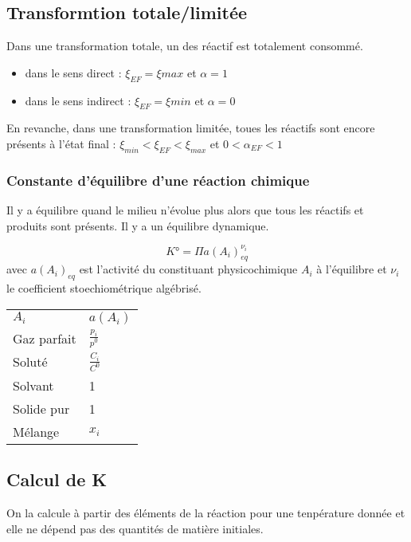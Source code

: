\documentclass[french]{yLectureNote}
\begin{document}
\subsection{Transformtion totale/limitée}
Dans une transformation totale, un des réactif est totalement consommé.
\begin{itemize}
 \item dans le sens direct : $\xi_{EF} = \xi{max}$ et $\alpha = 1$
 \item dans le sens indirect : $\xi_{EF} = \xi{min}$ et $\alpha = 0$
\end{itemize}

En revanche, dans une transformation limitée, toues les réactifs sont encore présents à l'état final : $\xi_{min} < \xi_{EF} < \xi_{max}$ et $0<\alpha_{EF} <1$
\subsubsection{Constante d'équilibre d'une réaction chimique}
Il y a équilibre quand le milieu n'évolue plus alors que tous les réactifs et produits sont présents. Il y a un équilibre dynamique.



\begin{definition}
\[K° = \Pi a(A_i)_{eq}^{\nu_i}\] avec $a(A_i)_{eq}$ est l'activité du constituant physicochimique $A_i$ à l'équilibre et $\nu_i$ le coefficient stoechiométrique algébrisé.
\end{definition}

\begin{center}
\begin{tabular}{ll}
$A_i$ & $a(A_i)$\\
Gaz parfait & $\frac{p_i}{p^0}$\\
Soluté & $\frac{C_i}{C^0}$\\
Solvant & 1\\
Solide pur & 1\\
Mélange & $x_i$
\end{tabular}
\end{center}
\subsection{Calcul de K}
On la calcule  à partir des éléments de la réaction pour une tenpérature donnée et elle ne dépend pas des quantités de matière initiales.
\end{document}
